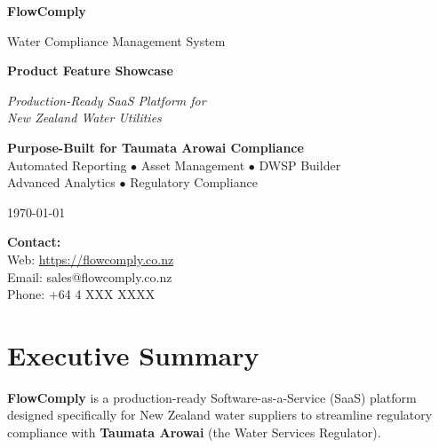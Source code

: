 \documentclass[11pt,a4paper]{article}
\begin{document}
\begin{titlepage}
    \centering
    \vspace*{2cm}

    {\Huge\bfseries\color{primaryblue} FlowComply\par}
    \vspace{0.5cm}
    {\Large Water Compliance Management System\par}
    \vspace{2cm}

    {\huge\bfseries Product Feature Showcase\par}
    \vspace{1cm}

    {\Large\itshape Production-Ready SaaS Platform for\\New Zealand Water Utilities\par}
    \vspace{2cm}

    \begin{highlightbox}
        \centering
        \large
        \textbf{Purpose-Built for Taumata Arowai Compliance}\\[0.5cm]
        Automated Reporting $\bullet$ Asset Management $\bullet$ DWSP Builder\\
        Advanced Analytics $\bullet$ Regulatory Compliance
    \end{highlightbox}

    \vfill

    {\large \today\par}
    \vspace{1cm}

    {\large
    \textbf{Contact:}\\
    Web: \url{https://flowcomply.co.nz}\\
    Email: sales@flowcomply.co.nz\\
    Phone: +64 4 XXX XXXX
    \par}

\end{titlepage}

\tableofcontents
\newpage

\section{Executive Summary}

\textbf{FlowComply} is a production-ready Software-as-a-Service (SaaS) platform designed specifically for New Zealand water suppliers to streamline regulatory compliance with \textbf{Taumata Arowai} (the Water Services Regulator).
\end{document}
